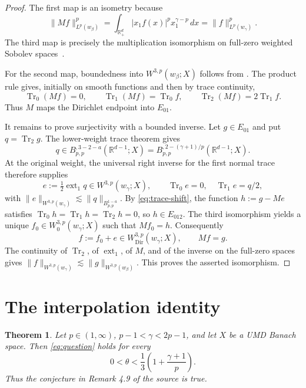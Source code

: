 \documentclass[11pt]{article}
\newtheorem{theorem}{Theorem}
\newcommand{\R}{\mathbb R}
\newcommand{\Tr}{\operatorname{Tr}}
\newcommand{\Dir}{\mathrm{Dir}}
\newcommand{\M}{M}
\begin{document}
\begin{proof}
The first map is an isometry because
\[
 \|\M f\|_{L^p(w_\beta)}^p
 =\int_{\R^d_+}|x_1f(x)|^p x_1^{\gamma-p}\,dx
 =\|f\|_{L^p(w_\gamma)}^p.
\]
The third map is precisely the multiplication isomorphism on full-zero
weighted Sobolev spaces~\cite[Lemma 3.6(ii)]{halfspace}.

For the second map, boundedness into $W^{3,p}(w_\beta;X)$ follows from
\cite[Lemma 3.6(i)]{halfspace}.  The product rule gives, initially on smooth
functions and then by trace continuity,
\begin{equation}\label{eq:trace-shift}
 \Tr_0(\M f)=0,\qquad
 \Tr_1(\M f)=\Tr_0f,\qquad
 \Tr_2(\M f)=2\Tr_1f.
\end{equation}
Thus $\M$ maps the Dirichlet endpoint into $E_{01}$.

It remains to prove surjectivity with a bounded inverse.  Let $g\in E_{01}$
and put $q=\Tr_2g$.  The lower-weight trace theorem gives
\[
 q\in B^{,3-2-a}_{p,p}(\R^{d-1};X)
   =B^{,2-(\gamma+1)/p}_{p,p}(\R^{d-1};X).
\]
At the original weight, the universal right inverse for the first normal
trace~\cite[Theorem 4.6]{interpolation} therefore supplies
\[
 e:=\tfrac12\operatorname{ext}_1q\in W^{3,p}(w_\gamma;X),
 \qquad \Tr_0e=0,\quad \Tr_1e=q/2,
\]
with $\|e\|_{W^{3,p}(w_\gamma)}\lesssim\|q\|_{B^{1-a}_{p,p}}$.
By \eqref{eq:trace-shift}, the function $h:=g-\M e$ satisfies
$\Tr_0h=\Tr_1h=\Tr_2h=0$, so $h\in E_{012}$.  The third isomorphism yields a
unique $f_0\in W^{3,p}_0(w_\gamma;X)$ such that $\M f_0=h$.  Consequently
\[
 f:=f_0+e\in W^{3,p}_{\Dir}(w_\gamma;X),
 \qquad \M f=g.
\]
The continuity of $\Tr_2$, of $\operatorname{ext}_1$, of $\M$, and of the
inverse on the full-zero spaces gives
$\|f\|_{W^{3,p}(w_\gamma)}\lesssim\|g\|_{W^{3,p}(w_\beta)}$.
This proves the asserted isomorphism.
\end{proof}

\section{The interpolation identity}

\begin{theorem}\label{thm:main}
Let $p\in(1,\infty)$, $p-1<\gamma<2p-1$, and let $X$ be a UMD Banach space.
Then \eqref{eq:question} holds for every
\[
 0<\theta<\frac13\left(1+\frac{\gamma+1}{p}\right).
\]
Thus the conjecture in Remark 4.9 of the source is true.
\end{theorem}
\end{document}
